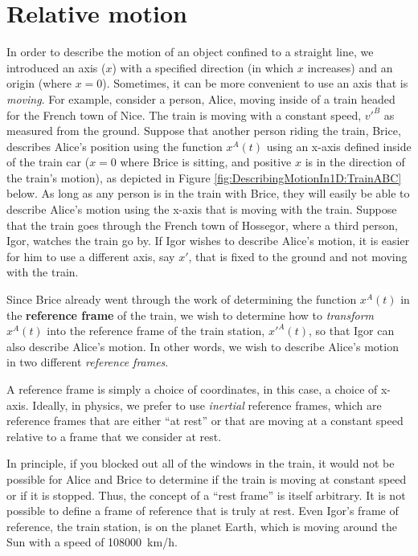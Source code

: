 \section{Relative motion}
\label{sec:describingmotionin1D:relativemotion}
In order to describe the motion of an object confined to a straight line, we introduced an axis ($x$) with a specified direction (in which $x$ increases) and an origin (where $x=0$). Sometimes, it can be more convenient to use an axis that is \textit{moving}. For example, consider a person, Alice, moving inside of a train headed for the French town of Nice. The train is moving with a constant speed, $v'^B$ as measured from the ground. Suppose that another person riding the train, Brice, describes Alice's position using the function $x^A(t)$ using an x-axis defined inside of the train car ($x=0$ where Brice is sitting, and positive $x$ is in the direction of the train's motion), as depicted in Figure \ref{fig:DescribingMotionIn1D:TrainABC} below. As long as any person is in the train with Brice, they will easily be able to describe Alice's motion using the x-axis that is moving with the train. Suppose that the train goes through the French town of Hossegor, where a third person, Igor, watches the train go by. If Igor wishes to describe Alice's motion, it is easier for him to use a different axis, say $x'$, that is fixed to the ground and not moving with the train. 

Since Brice already went through the work of determining the function $x^A(t)$ in the \textbf{reference frame} of the train, we wish to determine how to \textit{transform} $x^A(t)$ into the reference frame of the train station, $x'^A(t)$, so that Igor can also describe Alice's motion. In other words, we wish to describe Alice's motion in two different \textit{reference frames}.


A reference frame is simply a choice of coordinates, in this case, a choice of x-axis. Ideally, in physics, we prefer to use \textit{inertial} reference frames, which are reference frames that are either ``at rest'' or that are moving at a constant speed relative to a frame that we consider at rest.
 
 
In principle, if you blocked out all of the windows in the train, it would not be possible for Alice and Brice to determine if the train is moving at constant speed or if it is stopped. Thus, the concept of a ``rest frame'' is itself arbitrary. It is not possible to define a frame of reference that is truly at rest. Even Igor's frame of reference, the train station, is on the planet Earth, which is moving around the Sun with a speed of \SI{108000}{km/h}.


